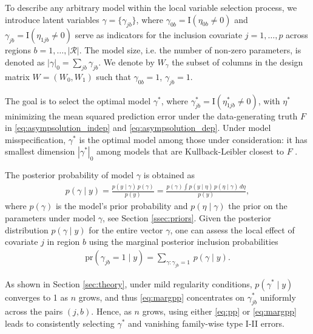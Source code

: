 To describe any arbitrary model within the local variable selection process, we introduce latent variables $\gamma= \{ \gamma_{jb} \}$, where
$\gamma_{0b}= \mbox{I}(\eta_{0b} \neq 0)$ and $\gamma_{jb}= \mbox{I}(\eta_{1jb} \neq 0)$ 
serve as indicators for the inclusion covariate $j=1,\ldots,p$ across regions $b=1,\ldots,|\mathcal{R}|$. The model size, i.e. the number of non-zero parameters, is denoted as $|\gamma|_0 = \sum_{jb} \gamma_{jb}$.
 We denote by $W_\gamma$ the subset of columns in the design matrix $W=(W_0,W_1)$ such that $\gamma_{0b}=1$, $\gamma_{jb}=1$.  

The goal is to select the optimal model $\gamma^*$, where $\gamma_{jb}^*= \mbox{I}(\eta_{1jb}^* \neq 0)$, with $\eta^*$ minimizing the  mean squared prediction error under the data-generating truth $F$ in \eqref{eq:asympsolution_indep} and \eqref{eq:asympsolution_dep}.
Under model misspecification, $\gamma^*$ is the optimal model among those under consideration: it has smallest dimension $|\gamma^*|_0$ among models that are Kullback-Leibler closest to $F$ \citep{rossell:2022}.

The posterior probability of model $\gamma$ is obtained as
\begin{align}
 p(\gamma \mid y)= \frac{p(y \mid \gamma) \, p(\gamma)}{p(y)}=
\frac{p(\gamma) \int p(y \mid \eta)\,  p(\eta \mid \gamma)\,  d\eta}{p(y)},
\label{eq:pp}
\end{align}
where $p(\gamma)$ is the model's prior probability and $p(\eta \mid \gamma)$ the prior on the parameters under model $\gamma$, see Section \ref{ssec:priors}.
Given the posterior distribution $p(\gamma \mid y)$ for the entire vector $\gamma$, one can assess the local effect of covariate $j$ in region $b$ using the marginal posterior inclusion probabilities
\begin{align}
 \mbox{pr}(\gamma_{jb}=1 \mid y)= \sum_{\gamma: \gamma_{jb}=1} \, p(\gamma \mid y).
\label{eq:margpp}
\end{align}

As shown in Section \ref{sec:theory}, under mild regularity conditions, $p(\gamma^* \mid y)$ converges to 1 as $n$ grows, and thus \eqref{eq:margpp} concentrates on $\gamma^*_{jb}$ uniformly across the pairs $(j, b)$.
Hence, as $n$ grows, using either \eqref{eq:pp} or \eqref{eq:margpp} leads to consistently selecting $\gamma^*$ and vanishing family-wise type I-II errors.

